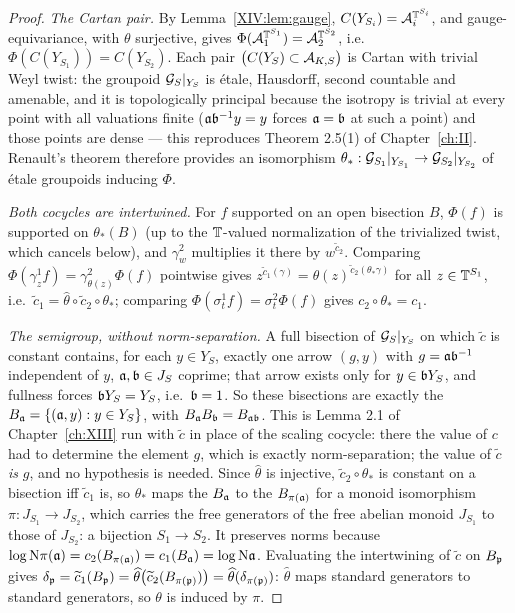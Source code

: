 \begin{proof}
\emph{The Cartan pair.} By Lemma~\ref{XIV:lem:gauge}, $C(Y_{S_i})=\mathcal{A}_i^{\mathbb{T}^{S_i}}$, and
gauge-equivariance, with $\theta$ surjective, gives
$\Phi(\mathcal{A}_1^{\mathbb{T}^{S_1}})=\mathcal{A}_2^{\mathbb{T}^{S_2}}$, i.e.\ $\Phi(C(Y_{S_1}))=C(Y_{S_2})$. Each pair
$\bigl(C(Y_S)\subset\mathcal{A}_{K,S}\bigr)$ is Cartan with trivial Weyl twist: the groupoid
$\mathcal{G}_S|_{Y_S}$ is \'etale, Hausdorff, second countable and amenable, and it is
topologically principal because the isotropy is trivial at every point with all valuations
finite ($\mathfrak{a}\mathfrak{b}^{-1}y=y$ forces $\mathfrak{a}=\mathfrak{b}$ at such a point) and those points are dense ---
this reproduces Theorem 2.5(1) of Chapter~\ref{ch:II}. Renault's theorem \cite{Renault}
therefore provides an isomorphism $\theta_*:\mathcal{G}_{S_1}|_{Y_{S_1}}\to\mathcal{G}_{S_2}|_{Y_{S_2}}$ of
\'etale groupoids inducing $\Phi$.

\emph{Both cocycles are intertwined.} For $f$ supported on an open bisection $B$, $\Phi(f)$
is supported on $\theta_*(B)$ (up to the $\mathbb{T}$-valued normalization of the trivialized
twist, which cancels below), and $\gamma^2_w$ multiplies it there by $w^{\widetilde
c_2}$. Comparing $\Phi(\gamma^1_z f)=\gamma^2_{\theta(z)}\Phi(f)$ pointwise gives
$z^{\widetilde c_1(\gamma)}=\theta(z)^{\widetilde c_2(\theta_*\gamma)}$ for all
$z\in\mathbb{T}^{S_1}$, i.e.\ $\widetilde c_1=\widehat\theta\circ\widetilde c_2\circ\theta_*$;
comparing $\Phi(\sigma^1_t f)=\sigma^2_t\Phi(f)$ gives $c_2\circ\theta_*=c_1$.

\emph{The semigroup, without norm-separation.} A full bisection of $\mathcal{G}_S|_{Y_S}$ on which
$\widetilde c$ is constant contains, for each $y\in Y_S$, exactly one arrow $(g,y)$ with
$g=\mathfrak{a}\mathfrak{b}^{-1}$ independent of $y$, $\mathfrak{a},\mathfrak{b}\in J_S$ coprime; that arrow exists only for
$y\in\mathfrak{b} Y_S$, and fullness forces $\mathfrak{b} Y_S=Y_S$, i.e.\ $\mathfrak{b}=1$. So these bisections are
exactly the $B_{\mathfrak{a}}=\{(\mathfrak{a},y):y\in Y_S\}$, with $B_{\mathfrak{a}} B_{\mathfrak{b}}=B_{\mathfrak{a}\mathfrak{b}}$. This is
Lemma 2.1 of Chapter~\ref{ch:XIII} run with $\widetilde c$ in place of the scaling cocycle: there the
value of $c$ had to determine the element $g$, which is exactly norm-separation; the value
of $\widetilde c$ \emph{is} $g$, and no hypothesis is needed. Since $\widehat\theta$ is
injective, $\widetilde c_2\circ\theta_*$ is constant on a bisection iff $\widetilde c_1$
is, so $\theta_*$ maps the $B_{\mathfrak{a}}$ to the $B_{\pi(\mathfrak{a})}$ for a monoid isomorphism
$\pi:J_{S_1}\to J_{S_2}$, which carries the free generators of the free abelian monoid
$J_{S_1}$ to those of $J_{S_2}$: a bijection $S_1\to S_2$. It preserves norms because
$\log\mathrm{N}\pi(\mathfrak{a})=c_2(B_{\pi(\mathfrak{a})})=c_1(B_{\mathfrak{a}})=\log\mathrm{N}\mathfrak{a}$. Evaluating the intertwining
of $\widetilde c$ on $B_{\mathfrak{p}}$ gives
$\delta_{\mathfrak{p}}=\widetilde c_1(B_{\mathfrak{p}})=\widehat\theta\bigl(\widetilde
c_2(B_{\pi(\mathfrak{p})})\bigr)=\widehat\theta(\delta_{\pi(\mathfrak{p})})$: $\widehat\theta$ maps standard
generators to standard generators, so $\theta$ is induced by $\pi$.


\end{proof}
